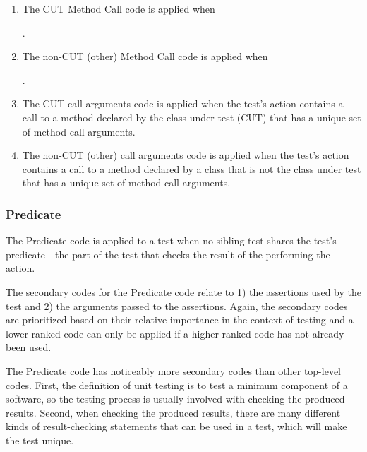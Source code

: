 \documentclass[proposal.tex]{subfiles}
\begin{document}
\begin{enumerate}
    \item The CUT Method Call code is applied when 
    .
    \item The non-CUT (other) Method Call code is applied when 
    .
    \item The CUT call arguments code is applied when the test’s action contains a call to a method declared by the class under test (CUT) that has a unique set of method call arguments. 
    \item The non-CUT (other) call arguments code is applied when the test’s action contains a call to a method declared by a class that is not the class under test that has a unique set of method call arguments. 
\end{enumerate}

\subsubsection{Predicate}

The Predicate code is applied to a test when no sibling test shares the test’s predicate - the part of the test that checks the result of the performing the action.

The secondary codes for the Predicate code relate to 1) the assertions used by the test and 2) the arguments passed to the assertions.
%
Again, the secondary codes are prioritized based on their relative importance in the context of testing and a lower-ranked code can only be applied if a higher-ranked code has not already been used.

The Predicate code has noticeably more secondary codes than other top-level codes.
%
First, the definition of unit testing is to test a minimum component of a software, so the testing process is usually involved with checking the produced results.
%
Second, when checking the produced results, there are many different kinds of result-checking statements that can be used in a test, which will make the test unique.
\end{document}
